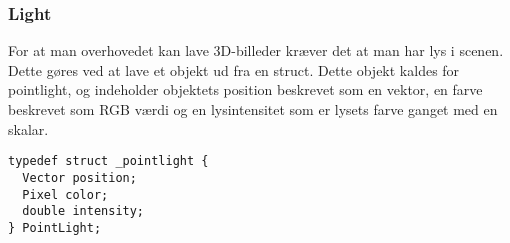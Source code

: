 \subsubsection{Light}
For at man overhovedet kan lave 3D-billeder kræver det at man har lys i scenen. Dette gøres ved at lave et objekt ud fra en struct. Dette objekt kaldes for pointlight, og indeholder objektets position beskrevet som en vektor, en farve beskrevet som RGB værdi og en lysintensitet som er lysets farve ganget med en skalar.

\begin{lstlisting}[style=Cstyle, caption=light struct]
typedef struct _pointlight {
  Vector position;
  Pixel color;
  double intensity;
} PointLight;
\end{lstlisting}
